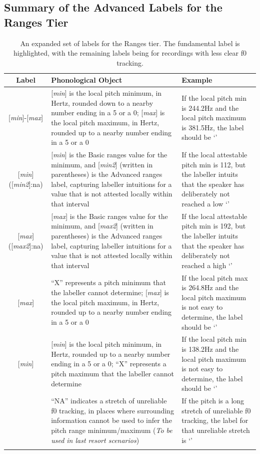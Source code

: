 \documentclass[11pt, twoside]{memoir}
\def\textlabel#1{{\relsize{-.5}\fontspec[Mapping=tex-text]{Roboto Mono}{#1}}}
\begin{document}
\subsection{Summary of the Advanced Labels for the Ranges Tier}\label{sec:summary-advanced-ranges-labels}
\begin{longtable}{cp{.46\linewidth}p{.32\linewidth}} \toprule \textbf{Label} & \textbf{Phonological Object} & \textbf{Example}\tabularnewline
\midrule \endhead
\rowcolor{green}
{[\textit{min}]-[\textit{max}]} &
	{[\textit{min}] is the local pitch minimum, in Hertz, rounded down to a nearby number ending in a 5 or a 0}; {[\textit{max}] is the local pitch maximum, in Hertz, rounded up to a nearby number ending in a 5 or a 0} &
	If the local pitch min is 244.2Hz and the local pitch maximum is 381.5Hz, the label should be ‘\textlabel{240-385}’
	\tabularnewline
{[\textit{min}]([\textit{min2}]:na)} &
	[\textit{min}] is the Basic ranges value for the minimum, and [\textit{min2}] (written in parentheses) is the Advanced ranges label, capturing labeller intuitions for a value that is not attested locally within that interval &
	If the local attestable pitch min is 112, but the labeller intuits that the speaker has deliberately not reached a low ‘\textlabel{110(90:na)-385}’
	\tabularnewline
{[\textit{max}]([\textit{max2}]:na)} &
	[\textit{max}] is the Basic ranges value for the minimum, and [\textit{max2}] (written in parentheses) is the Advanced ranges label, capturing labeller intuitions for a value that is not attested locally within that interval &
	If the local attestable pitch min is 192, but the labeller intuits that the speaker has deliberately not reached a high ‘\textlabel{90-192(300:na)}’
	\tabularnewline
{\textlabel{X-}[\textit{max}]} &
	{“X” represents a pitch minimum that the labeller cannot determine}; {[\textit{max}] is the local pitch maximum, in Hertz, rounded up to a nearby number ending in a 5 or a 0}	 &
	If the local pitch max is 264.8Hz and the local pitch maximum is not easy to determine, the label should be ‘\textlabel{X-270}’
	\tabularnewline
{[\textit{min}]\textlabel{-X}} &
	{[\textit{min}] is the local pitch minimum, in Hertz, rounded up to a nearby number ending in a 5 or a 0}; {“X” represents a pitch maximum that the labeller cannot determine}	 &
	If the local pitch min is 138.2Hz and the local pitch maximum is not easy to determine, the label should be ‘\textlabel{135-X}’
	\tabularnewline
\textlabel{NA} &
	“NA” indicates a stretch of unreliable f0 tracking, in places where surrounding information cannot be used to infer the pitch range minimum\slash maximum (\textit{To be used in last resort scenarios}) &
	If the pitch is a long stretch of unreliable f0 tracking, the label for that unreliable stretch is ‘\textlabel{NA}’
	\tabularnewline
\bottomrule 
\caption[An expanded set of labels for the Ranges tier.]{An expanded set of labels for the Ranges tier. The fundamental label is highlighted, with the remaining labels being for recordings with less clear f0 tracking.}
\end{longtable}
\end{document}
